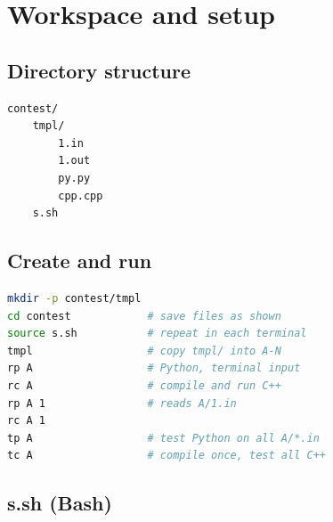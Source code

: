 \section{Workspace and setup}\label{setup:workspace}
\subsection{Directory structure}\label{setup:structure}
\begin{lstlisting}[language={}]
contest/
    tmpl/
        1.in
        1.out
        py.py
        cpp.cpp
    s.sh
\end{lstlisting}

\par\noindent\begin{minipage}{\linewidth}
\subsection{Create and run}\label{setup:debug}
\begin{lstlisting}[language=bash]
mkdir -p contest/tmpl
cd contest            # save files as shown
source s.sh           # repeat in each terminal
tmpl                  # copy tmpl/ into A-N
rp A                  # Python, terminal input
rc A                  # compile and run C++
rp A 1                # reads A/1.in
rc A 1
tp A                  # test Python on all A/*.in
tc A                  # compile once, test all C++
\end{lstlisting}
\end{minipage}\par
{}

\columnbreak
\par\noindent\begin{minipage}{\linewidth}
\subsection{s.sh (Bash)}\label{setup:commands}

\end{minipage}\par

